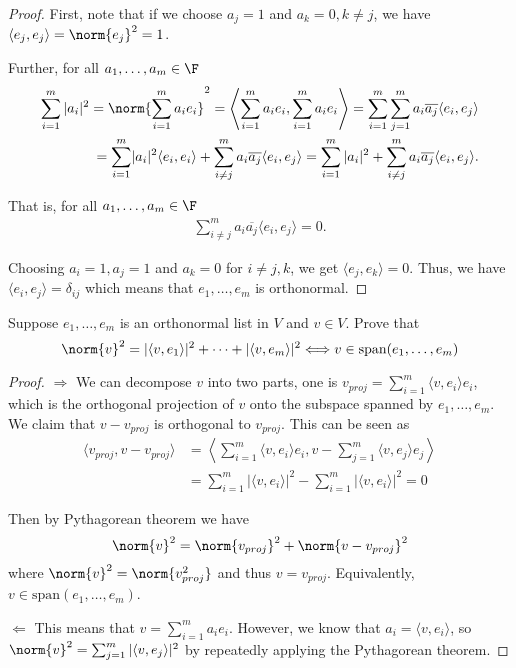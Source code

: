 \documentclass{extarticle}
\begin{document}
\begin{proof}
First, note that if we choose \( a_j = 1 \) and \( a_k = 0, k \ne j \), we have
\( \langle e_j, e_j \rangle = \norm{e_j}^2 = 1 \).

Further, for all \(a_1, \ldots, a_m \in \F\)
\begin{align*}
    \sum_{i=1}^{m} |a_i|^2
    = \norm{\sum_{i=1}^{m} a_i e_i}^2
    = \left\langle \sum_{i=1}^{m} a_i e_i , \sum_{i=1}^{m} a_i e_i \right\rangle
    = \sum_{i=1}^{m} \sum_{j=1}^{m} a_i \overline{a_j} \langle e_i, e_j \rangle \\
    = \sum_{i=1}^{m} \lvert a_i \rvert^2 \langle e_i, e_i \rangle
    + \sum_{i \ne j}^{m} a_i \overline{a_j} \langle e_i, e_j \rangle
    = \sum_{i=1}^{m} |a_i|^2
    + \sum_{i \ne j}^{m} a_i \overline{a_j} \langle e_i, e_j \rangle.
\end{align*}

That is, for all \(a_1, \ldots, a_m \in \F\)
\begin{align*}
    \sum_{i \ne j}^{m} a_i \overline{a_j} \langle e_i, e_j \rangle = 0.
\end{align*}

Choosing \( a_i=1, a_j =1 \) and \( a_k=0 \) for \( i \ne j, k\), we get
\( \langle e_j, e_k \rangle = 0 \).
Thus, we have \(  \langle e_i, e_j \rangle = \delta_{ij} \) which means that
\( e_1, \ldots, e_m \) is orthonormal.
\end{proof}

\begin{problem}{3}
    Suppose \(e_1, \ldots, e_m\) is an orthonormal list in \(V\) and \(v \in V\). Prove that
    \[\norm{v}^2 = |\langle v,e_1 \rangle|^2 + \cdots + |\langle v,e_m \rangle|^2
    \Longleftrightarrow v \in \text{span}(e_1, \ldots, e_m)\]
\end{problem}

\begin{proof}
\(\Rightarrow\) We can decompose \(v\) into two parts, one is \(v_{proj} = \sum_{i=1}^{m}
\langle v,e_i \rangle e_i\), which is the orthogonal projection of \(v\) onto the subspace
spanned by \(e_1, \ldots, e_m\). We claim that \(v - v_{proj}\) is orthogonal to \(v_{proj}\).
This can be seen as
\begin{align*}
    \langle v_{proj}, v - v_{proj} \rangle
    &= \left\langle \sum_{i=1}^{m} \langle v,e_i \rangle e_i, v - \sum_{j=1}^{m} \langle v,e_j \rangle e_j \right\rangle \\
    &= \sum_{i=1}^{m} |\langle v,e_i \rangle|^2 - \sum_{i=1}^{m} |\langle v,e_i \rangle|^2 = 0
\end{align*}

Then by Pythagorean theorem we have
\[\norm{v}^2 = \norm{v_{proj}}^2 + \norm{v - v_{proj}}^2 \]
where \(\norm{v}^2 = \norm{v_{proj}^2}\) and thus \(v = v_{proj}\). Equivalently, \(v \in \text{span}
(e_1, \ldots, e_m)\).

\(\Leftarrow\) This means that \(v = \sum_{i=1}^{m} a_i e_i\). However, we know that
\(a_i = \langle v,e_i \rangle\), so \(\norm{v}^2 = \sum_{j=1}^{m} |\langle v,e_j \rangle|^2\) by
repeatedly applying the Pythagorean theorem.
\end{proof}
\end{document}
